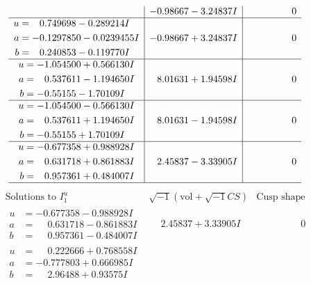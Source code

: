 \documentclass[1p]{elsarticle_modified}
\theoremstyle{definition}
\newcommand{\I}{\sqrt{-1}}
\begin{document}
$$\begin{array}{c|c|c}
 & -0.98667 - 3.24837 I & \phantom{-0.000000 } 0 \\ \hline\begin{aligned}
u &= \phantom{-}0.749698 - 0.289214 I \\
a &= -0.1297850 - 0.0239455 I \\
b &= \phantom{-}0.240853 - 0.119770 I\end{aligned}
 & -0.98667 + 3.24837 I & \phantom{-0.000000 } 0 \\ \hline\begin{aligned}
u &= -1.054500 + 0.566130 I \\
a &= \phantom{-}0.537611 - 1.194650 I \\
b &= -0.55155 - 1.70109 I\end{aligned}
 & \phantom{-}8.01631 + 1.94598 I & \phantom{-0.000000 } 0 \\ \hline\begin{aligned}
u &= -1.054500 - 0.566130 I \\
a &= \phantom{-}0.537611 + 1.194650 I \\
b &= -0.55155 + 1.70109 I\end{aligned}
 & \phantom{-}8.01631 - 1.94598 I & \phantom{-0.000000 } 0 \\ \hline\begin{aligned}
u &= -0.677358 + 0.988928 I \\
a &= \phantom{-}0.631718 + 0.861883 I \\
b &= \phantom{-}0.957361 + 0.484007 I\end{aligned}
 & \phantom{-}2.45837 - 3.33905 I & \phantom{-0.000000 } 0\\
 \hline 
 \end{array}$$\newpage$$\begin{array}{c|c|c}  
\text{Solutions to }I^u_{1}& \I (\text{vol} + \sqrt{-1}CS) & \text{Cusp shape}\\
 \hline 
\begin{aligned}
u &= -0.677358 - 0.988928 I \\
a &= \phantom{-}0.631718 - 0.861883 I \\
b &= \phantom{-}0.957361 - 0.484007 I\end{aligned}
 & \phantom{-}2.45837 + 3.33905 I & \phantom{-0.000000 } 0 \\ \hline\begin{aligned}
u &= \phantom{-}0.222666 + 0.768558 I \\
a &= -0.777803 + 0.666985 I \\
b &= \phantom{-}2.96488 + 0.93575 I\end{aligned}

\end{array}$$
\end{document}
